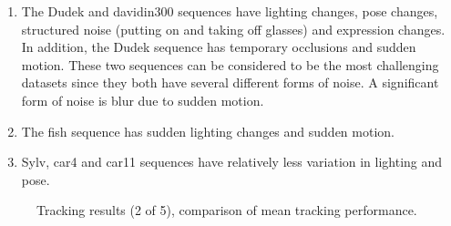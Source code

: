 \begin{enumerate}
\item The Dudek and davidin300 sequences have lighting changes, pose changes, structured noise (putting on and taking off glasses) and expression changes.  In addition, the Dudek sequence has temporary occlusions and sudden motion.  These two sequences can be considered to be the most challenging datasets since they both have several different forms of noise.  A significant form of noise is blur due to sudden motion.  
\item The fish sequence has sudden lighting changes and sudden motion.
\item Sylv, car4 and car11 sequences have relatively less variation in lighting and pose.
\end{enumerate}

								\begin{figure}[t]
								\centering
								
								\caption{Tracking results (2 of 5), comparison of mean tracking performance.}
								\label{fig:results_final_2_mean}
								\end{figure}


